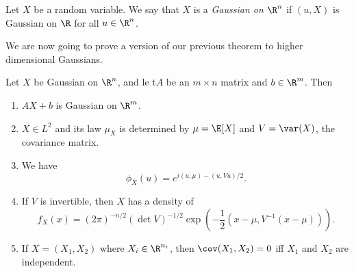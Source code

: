 \documentclass[a4paper]{article}
\begin{document}
\begin{defi}
  Let $X$ be a random variable. We say that $X$ is a \emph{Gaussian on $\R^n$} if $(u, X)$ is Gaussian on $\R$ for all $u \in \R^n$.
\end{defi}

We are now going to prove a version of our previous theorem to higher dimensional Gaussians.
\begin{thm}
  Let $X$ be Gaussian on $\R^n$, and le t$A$ be an $m \times n$ matrix and $b \in \R^m$. Then
  \begin{enumerate}
    \item $AX + b$ is Gaussian on $\R^m$.
    \item $X \in L^2$ and its law $\mu_X$ is determined by $\mu = \E[X]$ and $V = \var(X)$, the covariance matrix.
    \item We have
      \[
        \phi_X(u) = e^{i(u, \mu) - (u, Vu)/2}.
      \]
    \item If $V$ is invertible, then $X$ has a density of
      \[
        f_X (x) = (2\pi)^{-n/2} (\det V)^{-1/2} \exp\left(-\frac{1}{2} (x - \mu, V^{-1}(x - \mu))\right).
      \]
    \item If $X = (X_1, X_2)$ where $X_i \in \R^{n_i}$, then $\cov(X_1, X_2) = 0$ iff $X_1$ and $X_2$ are independent.
  \end{enumerate}
\end{thm}
\end{document}
